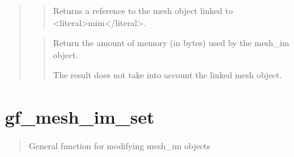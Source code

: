 \documentclass[a4paper,11pt,english]{sphinxmanual}
\begin{document}
\begin{quote}
\begin{quote}
\sphinxAtStartPar
Returns a reference to the mesh object linked to \textless{}literal\textgreater{}mim\textless{}/literal\textgreater{}.
\end{quote}

\sphinxAtStartPar
{}
\begin{quote}

\sphinxAtStartPar
Return the amount of memory (in bytes) used by the mesh\_im object.

\sphinxAtStartPar
The result does not take into account the linked mesh object.
\end{quote}
\end{quote}


\section{gf\_mesh\_im\_set}
\label{\detokenize{scilab/cmdref_gf_mesh_im_set:gf-mesh-im-set}}\label{\detokenize{scilab/cmdref_gf_mesh_im_set::doc}}
\sphinxAtStartPar
{}

\begin{sphinxVerbatim}[commandchars=\\\{\}]
    \PYG{p}{[}  \PYG{p}{]}
  
\end{sphinxVerbatim}

\sphinxAtStartPar
{}
\begin{quote}

\sphinxAtStartPar
General function for modifying mesh\_im objects
\end{quote}
\end{document}
